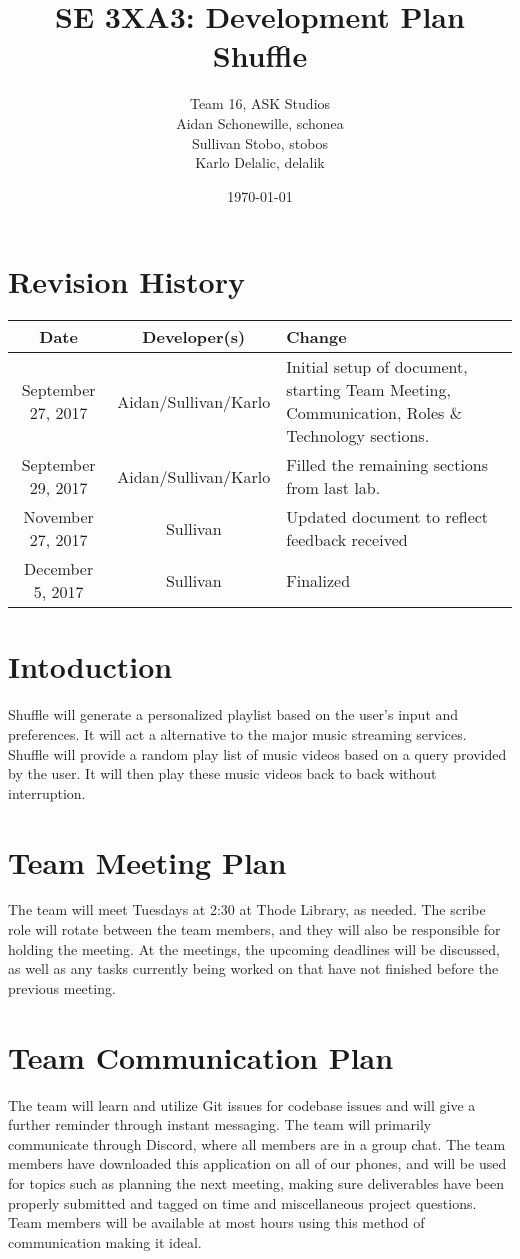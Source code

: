 \documentclass{article}
\title{SE 3XA3: Development Plan\\Shuffle}
\author{Team 16, ASK Studios
        \\ Aidan Schonewille, schonea
        \\ Sullivan Stobo, stobos
        \\ Karlo Delalic, delalik
}
\date{\today}
\begin{document}
\section*{Revision History}
\begin{center}
\begin{tabular}{| c | c | p{6cm} |}
\hline
\textbf{Date} & \textbf{Developer(s)} & \textbf{Change}\\
\hline
September 27, 2017 & Aidan/Sullivan/Karlo & Initial setup of document, starting Team Meeting, Communication, Roles \& Technology sections.\\
\hline
September 29, 2017 & Aidan/Sullivan/Karlo & Filled the remaining sections from last lab.\\
\hline
November 27, 2017 & Sullivan & Updated document to reflect feedback received \\
\hline
December 5, 2017 & Sullivan & Finalized \\
\hline
\end{tabular}
\end{center}

\newpage

\maketitle

\newpage

\section*{Intoduction}
Shuffle will generate a personalized playlist based on the user's input and preferences. It will act a alternative to the major music streaming services. Shuffle will provide a random play list of music videos based on a query provided by the user.  It will then play these music videos back to back without interruption.

\section{Team Meeting Plan}
The team will meet Tuesdays at 2:30 at Thode Library, as needed. The scribe role will rotate between the team members, and they will also be responsible for holding the meeting. At the meetings, the upcoming deadlines will be discussed, as well as any tasks currently being worked on that have not finished before the previous meeting.

\section{Team Communication Plan}
The team will learn and utilize Git issues for codebase issues and will give a further reminder through instant messaging. The team will primarily communicate through Discord, where all members are in a group chat. The team members have downloaded this application on all of our phones, and will be used for topics such as planning the next meeting, making sure deliverables have been properly submitted and tagged on time and miscellaneous project questions.  \color{red}Team members will be available at most hours using this method of communication making it ideal.\color{black}
\end{document}
